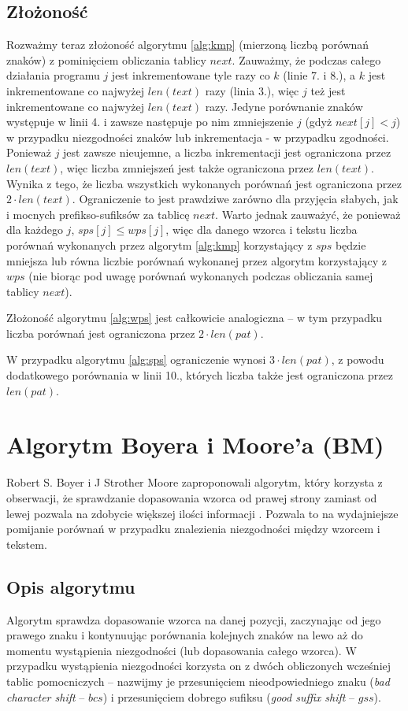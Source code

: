 \subsection{Złożoność}
Rozważmy teraz złożoność algorytmu \ref{alg:kmp} (mierzoną liczbą porównań znaków) z pominięciem obliczania tablicy $next$. Zauważmy, że podczas całego działania programu $j$ jest inkrementowane tyle razy co $k$ (linie 7. i 8.), a $k$ jest inkrementowane co najwyżej $len(text)$ razy (linia 3.), więc $j$ też jest inkrementowane co najwyżej $len(text)$ razy. Jedyne porównanie znaków występuje w linii 4. i zawsze następuje po nim zmniejszenie $j$ (gdyż $next[j] < j$) w przypadku niezgodności znaków lub inkrementacja - w przypadku zgodności. Ponieważ $j$ jest zawsze nieujemne, a liczba inkrementacji jest ograniczona przez $len(text)$, więc liczba zmniejszeń jest także ograniczona przez $len(text)$. Wynika z tego, że liczba wszystkich wykonanych porównań jest ograniczona przez $2 \cdot len(text)$. Ograniczenie to jest prawdziwe zarówno dla przyjęcia słabych, jak i mocnych prefikso-sufiksów za tablicę $next$. Warto jednak zauważyć, że ponieważ dla każdego $j$, $sps[j] \leq wps[j]$, więc dla danego wzorca i tekstu liczba porównań wykonanych przez algorytm \ref{alg:kmp} korzystający z $sps$ będzie mniejsza lub równa liczbie porównań wykonanej przez algorytm korzystający z $wps$ (nie biorąc pod uwagę porównań wykonanych podczas obliczania samej tablicy $next$).

Złożoność algorytmu \ref{alg:wps} jest całkowicie analogiczna -- w tym przypadku liczba porównań jest ograniczona przez $2 \cdot len(pat)$.

W przypadku algorytmu \ref{alg:sps} ograniczenie wynosi $3 \cdot len(pat)$, z powodu dodatkowego porównania w linii 10., których liczba także jest ograniczona przez $len(pat)$.

\newpage
\section{Algorytm Boyera i Moore’a (BM)}
Robert S. Boyer i J Strother Moore zaproponowali algorytm, który korzysta z obserwacji, że sprawdzanie dopasowania wzorca od prawej strony zamiast od lewej pozwala na zdobycie większej ilości informacji \cite{BM}. Pozwala to na wydajniejsze pomijanie porównań w przypadku znalezienia niezgodności między wzorcem i tekstem.  

\subsection{Opis algorytmu}
Algorytm sprawdza dopasowanie wzorca na danej pozycji, zaczynając od jego prawego znaku i kontynuując porównania kolejnych znaków na lewo aż do momentu wystąpienia niezgodności (lub dopasowania całego wzorca). W przypadku wystąpienia niezgodności korzysta on z dwóch obliczonych wcześniej tablic pomocniczych -- nazwijmy je przesunięciem nieodpowiedniego znaku (\textit{bad character shift} -- $bcs$) i przesunięciem dobrego sufiksu (\textit{good suffix shift} -- $gss$). 

